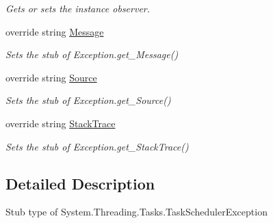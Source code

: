 \begin{DoxyCompactItemize}
\begin{DoxyCompactList}\small\item\em Gets or sets the instance observer.\end{DoxyCompactList}\item 
override string \hyperlink{class_system_1_1_threading_1_1_tasks_1_1_fakes_1_1_stub_task_scheduler_exception_ab323e01538465d551676c42d24abce5d}{Message}
\begin{DoxyCompactList}\small\item\em Sets the stub of Exception.\-get\-\_\-\-Message()\end{DoxyCompactList}\item 
override string \hyperlink{class_system_1_1_threading_1_1_tasks_1_1_fakes_1_1_stub_task_scheduler_exception_a72d0bd7d85b051df2cfc260335d3890d}{Source}
\begin{DoxyCompactList}\small\item\em Sets the stub of Exception.\-get\-\_\-\-Source()\end{DoxyCompactList}\item 
override string \hyperlink{class_system_1_1_threading_1_1_tasks_1_1_fakes_1_1_stub_task_scheduler_exception_a0d152ab6fc1eaab0b8f5456570b5de67}{Stack\-Trace}
\begin{DoxyCompactList}\small\item\em Sets the stub of Exception.\-get\-\_\-\-Stack\-Trace()\end{DoxyCompactList}\end{DoxyCompactItemize}


\subsection{Detailed Description}
Stub type of System.\-Threading.\-Tasks.\-Task\-Scheduler\-Exception



